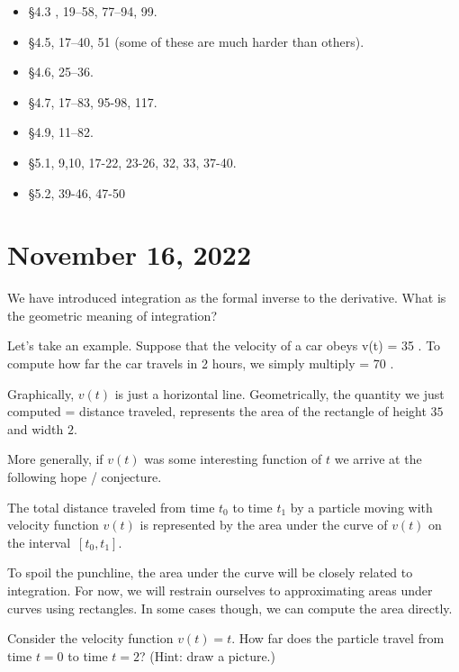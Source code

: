 \documentclass[11pt]{amsart}
\begin{document}
\begin{itemize}
\item \S 4.3 , 19--58, 77--94, 99. 
\item \S 4.5, 17--40, 51 (some of these are much harder than others). 
\item \S 4.6, 25--36. 
\item \S 4.7, 17--83, 95-98, 117. 
\item \S 4.9, 11--82. 
\item \S 5.1, 9,10, 17-22, 23-26, 32, 33, 37-40. 
\item \S 5.2, 39-46, 47-50
\end{itemize}

\newpage

\section*{November 16, 2022}

We have introduced integration as the formal inverse to the derivative. 
What is the geometric meaning of integration? 

Let's take an example. 
Suppose that the velocity of a car obeys 
\beqn
v(t) = 35 \quad {}. 
\eeqn
To compute how far the car travels in 2 hours, we simply multiply
 \;   \;  = 70 \;  .
\eeqn

Graphically, $v(t)$ is just a horizontal line. 
Geometrically, the quantity we just computed = distance traveled, represents the area of the rectangle of height $35$ and width $2$. 

More generally, if $v(t)$ was some interesting function of $t$ we arrive at the following hope / conjecture.

\begin{conj2}
The total distance traveled from time $t_0$ to time $t_1$ by a particle moving with velocity function $v(t)$ is represented by the area under the curve of $v(t)$ on the interval~$[t_0,t_1]$. 
\end{conj2}

To spoil the punchline, the area under the curve will be closely related to integration. 
For now, we will restrain ourselves to approximating areas under curves using rectangles. 
In some cases though, we can compute the area directly.

\vspace{2cm}

\begin{eg}
Consider the velocity function $v(t) = t$.
How far does the particle travel from time $t=0$ to time $t=2$?
(Hint: draw a picture.)
\end{eg}
\end{document}
